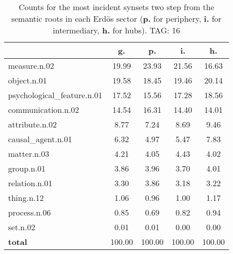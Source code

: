 \begin{table}[h!]
\begin{center}
\begin{tabular}{| l || c | c | c | c |}\hline
 & {\bf g.} & {\bf p.} & {\bf i.} & {\bf h.} \\\hline\hline
measure.n.02 & 19.99  & 23.93  & 21.56  & 16.63 \\\hline
object.n.01 & 19.58  & 18.45  & 19.46  & 20.14 \\\hline
psychological\_feature.n.01 & 17.52  & 15.56  & 17.28  & 18.56 \\\hline
communication.n.02 & 14.54  & 16.31  & 14.40  & 14.01 \\\hline
attribute.n.02 & 8.77  & 7.24  & 8.69  & 9.46 \\\hline
causal\_agent.n.01 & 6.32  & 4.97  & 5.47  & 7.83 \\\hline
matter.n.03 & 4.21  & 4.05  & 4.43  & 4.02 \\\hline
group.n.01 & 3.86  & 3.96  & 3.70  & 4.01 \\\hline
relation.n.01 & 3.30  & 3.86  & 3.18  & 3.22 \\\hline
thing.n.12 & 1.06  & 0.96  & 1.00  & 1.17 \\\hline
process.n.06 & 0.85  & 0.69  & 0.82  & 0.94 \\\hline
set.n.02 & 0.01  & 0.01  & 0.00  & 0.00 \\\hline\hline
{{\bf total}} & 100.00  & 100.00  & 100.00  & 100.00 \\\hline
\end{tabular}
\caption{Counts for the most incident synsets two step from the semantic roots in each Erd\"os sector ({\bf p.} for periphery, {\bf i.} for intermediary, {\bf h.} for hubs). TAG: 16}
\end{center}
\end{table}